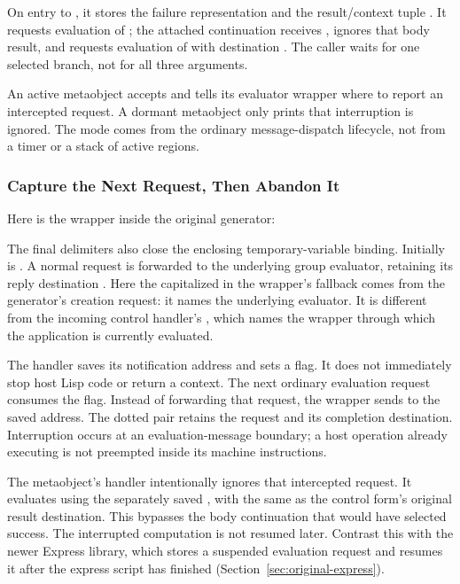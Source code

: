 On entry to , it stores the failure representation
and the result/context tuple . It requests
evaluation of ; the attached continuation receives
, ignores that body result, and requests evaluation of
 with destination . The caller waits for one
selected branch, not for all three arguments.

An active metaobject accepts \code{[:interrupt]} and tells its evaluator
wrapper where to report an intercepted request. A dormant metaobject
only prints that interruption is ignored. The mode comes from the
ordinary message-dispatch lifecycle, not from a timer or a stack of
active  regions.

\subsubsection{Capture the Next Request, Then Abandon It}

Here is the wrapper inside the original generator:


The final delimiters also close the enclosing temporary-variable binding.
Initially  is . A normal request 
is forwarded to the underlying group evaluator, retaining its reply
destination . Here the capitalized  in the wrapper's
fallback comes from the generator's creation request: it names the
underlying evaluator. It is different from the incoming control
handler's , which names the wrapper through which the
application is currently evaluated.

The \code{[:interrupt R]} handler saves its notification address and sets
a flag. It does not immediately stop host Lisp code or return a context.
The next ordinary evaluation request consumes the flag. Instead of
forwarding that request, the wrapper sends \code{[:context [any . R]]}
to the saved address. The dotted pair retains the request and its
completion destination. Interruption occurs at an evaluation-message
boundary; a host operation already executing is not preempted inside
its machine instructions.

The metaobject's \code{[:context \_]} handler intentionally ignores that
intercepted request. It evaluates  using the separately
saved , with the same  as the control
form's original result destination. This bypasses the body continuation
that would have selected success. The interrupted computation is not
resumed later. Contrast this with the newer Express library, which
stores a suspended evaluation request and resumes it after the express
script has finished (Section~\ref{sec:original-express}).

